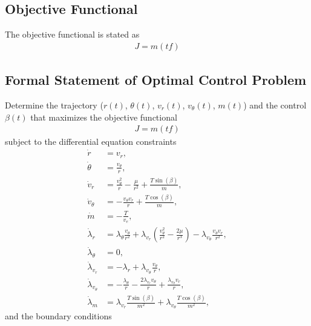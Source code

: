 \documentclass[]{article}
\begin{document}
\subsection{Objective Functional}
The objective functional is stated as
\begin{align}
	J = m(tf)
\end{align}
\subsection{Formal Statement of Optimal Control Problem}
Determine the trajectory (\(r(t)\), \(\theta(t)\), \(v_r(t)\), \(v_\theta(t)\), \(m(t)\)) and the control \(\beta(t)\) that maximizes the objective functional
\begin{align*}
	J = m(tf)
\end{align*}
subject to the differential equation constraints
\begin{align*}
	\dot{r}        &= v_r, \\
	\dot{\theta}   &= \frac{v_\theta}{r}, \\
	\dot{v}_r      &= \frac{v^2_{\theta}}{r} - \frac{\mu}{r^2} + \frac{T\sin(\beta)}{m}, \\
    \dot{v}_\theta &= -\frac{v_{\theta}v_{r}}{r}   + \frac{T\cos(\beta)}{m}, \\
	\dot{m}        &= -\frac{T}{v_e}, \\
	\dot{\lambda}_r      &=\lambda_\theta\frac{v_\theta}{r^2} + \lambda_{v_r}(\frac{v_{\theta}^2}{r^2} - \frac{2\mu}{r^3}) - \lambda_{v_\theta}\frac{v_{\theta}v_r}{r^2},\\
    \dot{\lambda}_\theta &= 0,                                                                                                    \\
    \dot{\lambda}_{v_r}  &= -\lambda_r + \lambda_{v_\theta}\frac{v_\theta}{r},                                                    \\
    \dot{\lambda}_{v_\theta} &= -\frac{\lambda_\theta}{r} - \frac{2\lambda_{v_r}v_\theta}{r} + \frac{\lambda_{v_\theta}v_r}{r}, \\
    \dot{\lambda}_m          &= \lambda_{v_r}\frac{T\sin(\beta)}{m^2} + \lambda_{v_\theta}\frac{T\cos(\beta)}{m^2},                      	
\end{align*}
and the boundary conditions                                                                                                                                                                
\end{document}
